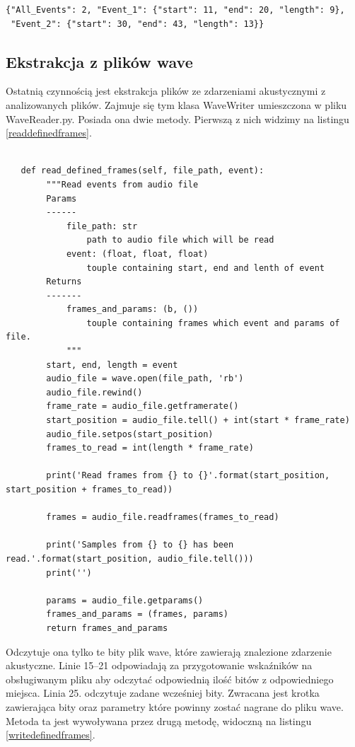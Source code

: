 \documentclass[eng,printmode]{mgr}
\begin{document}
\begin{lstlisting}[caption={Przykładowa zawartość pliku .json},captionpos=b,label={jsoncontent}] 
{"All_Events": 2, "Event_1": {"start": 11, "end": 20, "length": 9},
 "Event_2": {"start": 30, "end": 43, "length": 13}}
\end{lstlisting}

\subsection{Ekstrakcja z plików wave}
Ostatnią czynnością jest ekstrakcja plików ze zdarzeniami akustycznymi z analizowanych plików. Zajmuje się tym klasa WaveWriter umieszczona w pliku WaveReader.py. Posiada ona dwie metody. Pierwszą z nich widzimy na listingu \ref{readdefinedframes}.


\begin{minipage}{\linewidth}
\begin{lstlisting}[caption={Fragment kodu źródłowego pliku WaveReader.py,\newline klasa WaveWriter, metoda read\_defined\_frames},captionpos=b,label={readdefinedframes}] 

   def read_defined_frames(self, file_path, event):
        """Read events from audio file
        Params
        ------
            file_path: str
                path to audio file which will be read
            event: (float, float, float)
                touple containing start, end and lenth of event
        Returns
        -------
            frames_and_params: (b, ())
                touple containing frames which event and params of file.
            """
        start, end, length = event
        audio_file = wave.open(file_path, 'rb')
        audio_file.rewind()
        frame_rate = audio_file.getframerate()
        start_position = audio_file.tell() + int(start * frame_rate)
        audio_file.setpos(start_position)
        frames_to_read = int(length * frame_rate)

        print('Read frames from {} to {}'.format(start_position, start_position + frames_to_read))

        frames = audio_file.readframes(frames_to_read)

        print('Samples from {} to {} has been read.'.format(start_position, audio_file.tell()))
        print('')

        params = audio_file.getparams()
        frames_and_params = (frames, params)
        return frames_and_params
\end{lstlisting}
\end{minipage}
Odczytuje ona tylko te bity plik wave, które zawierają znalezione zdarzenie akustyczne. Linie 15--21 odpowiadają za przygotowanie wskaźników na obsługiwanym pliku aby odczytać odpowiednią ilość bitów z odpowiedniego miejsca. Linia 25. odczytuje zadane wcześniej bity. Zwracana jest krotka zawierająca bity oraz parametry które powinny zostać nagrane do pliku wave. Metoda ta jest wywoływana przez drugą metodę, widoczną na listingu \ref{writedefinedframes}.
\end{document}
